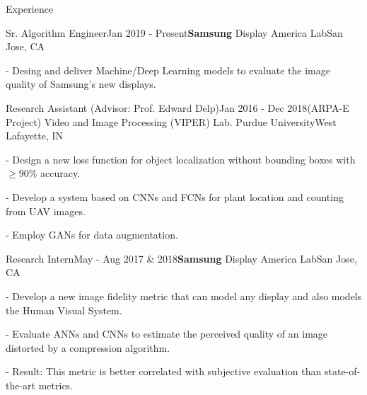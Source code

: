 \documentclass{resume} %
\begin{document}
% 


\begin{rSection}{Experience}

\begin{rSubsection}{Sr. Algorithm Engineer}{Jan 2019 - Present}{\textbf{Samsung} Display America Lab}{San Jose, CA}
\setlength{\itemindent}{.3in}
\item[-] Desing and deliver Machine/Deep Learning models to evaluate the image quality of Samsung's new displays.
\end{rSubsection}


\begin{rSubsection}{Research Assistant ({\normalfont Advisor}: Prof. Edward Delp)}{Jan 2016 - Dec 2018}{(ARPA-E Project) Video and Image Processing (VIPER) Lab. Purdue University}{West Lafayette, IN}
\setlength{\itemindent}{.3in}
\item[-] Design a new loss function for object localization without bounding boxes with $ \ge 90\%$ accuracy.
\item[-] Develop a system based on CNNs and FCNs for plant location and counting from UAV images.
\item[-] Employ GANs for data augmentation.
\end{rSubsection}


\begin{rSubsection}{Research Intern}{May - Aug 2017 \& 2018}{\textbf{Samsung} Display America Lab}{San Jose, CA}
\setlength{\itemindent}{.3in}
\item[-] Develop a new image fidelity metric that can model any display and also models the Human Visual System.
\item[-] Evaluate ANNs and CNNs to estimate the perceived quality of an image distorted by a compression algorithm.
\item[-] Result: This metric is better correlated with subjective evaluation than state-of-the-art metrics.
\end{rSubsection}


\end{rSection}
\end{document}
